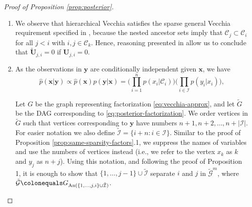 \documentclass[12pt,letterpaper]{article}
\theoremstyle{propstyle}
\theoremstyle{propstyle}
\theoremstyle{propstyle}
\theoremstyle{propstyle}
\theoremstyle{propstyle}
\newcommand{\bx}{\mathbf{x}}
\newcommand{\by}{\mathbf{y}}
\newcommand{\bU}{\mathbf{U}}
\newcommand{\condset}{\mathcal{C}}
\newcommand{\obs}{\mathcal{I}}
\newcommand{\An}{\text{An}}
\begin{document}
\begin{proof}[Proof of Proposition \ref{prop:posterior}]
~~ \\ \vspace{-5mm}
\begin{enumerate}
\item 
We observe that hierarchical Vecchia satisfies the sparse general Vecchia requirement specified in \citet[][Sect.~4]{Katzfuss2017a}, because the nested ancestor sets imply that $\condset_j \subset \condset_i$ for all $j<i$ with $i,j \in \condset_k$.
Hence, reasoning presented in \citet[][proof of Prop.~6]{Katzfuss2017a} allow us to conclude that $\widetilde{\bU}_{j,i}= 0$ if $\bU_{j,i}= 0$.

\item 


As the observations in $\by$ are conditionally independent given $\bx$, we have
\begin{equation}
\textstyle \hat{p}(\bx|\by) \propto \hat{p}(\bx) p(\by|\bx) = \big( \prod_{i=1}^n p(x_i|\condset_i) \big) \big( \prod_{i \in \obs} p(y_i|x_i) \big),
\label{eq:posterior-factorization}
\end{equation}

Let $G$ be the graph representing factorization \eqref{eq:vecchia-approx}, and let $\tilde{G}$ be the DAG corresponding to \eqref{eq:posterior-factorization}. We order vertices in $\tilde{G}$ such that vertices corresponding to $\by$ have numbers $n+1, n+2, \dots, n+|\mathcal{I}|$. For easier notation we also define $\tilde{\obs} = \{i+n : i\in \obs\}$.
Similar to the proof of Proposition \ref{prop:same-sparsity-factors}.1, we suppress the names of variables and use the numbers of vertices instead (i.e., we refer to the vertex $x_k$ as $k$ and $y_j$ as $n+j$). Using this notation, and following the proof of Proposition 1, it is enough to show that $\{1, \dots, j-1\} \cup \tilde{\obs}$ separate $i$ and $j$ in $\tilde{\mathcal{G}}^m$, where  $\tilde{\mathcal{G}} \colonequals G_{\An(\{1, \dots, j, i\} \cup \tilde{\obs})}$.


\end{enumerate}
\end{proof}
\end{document}

